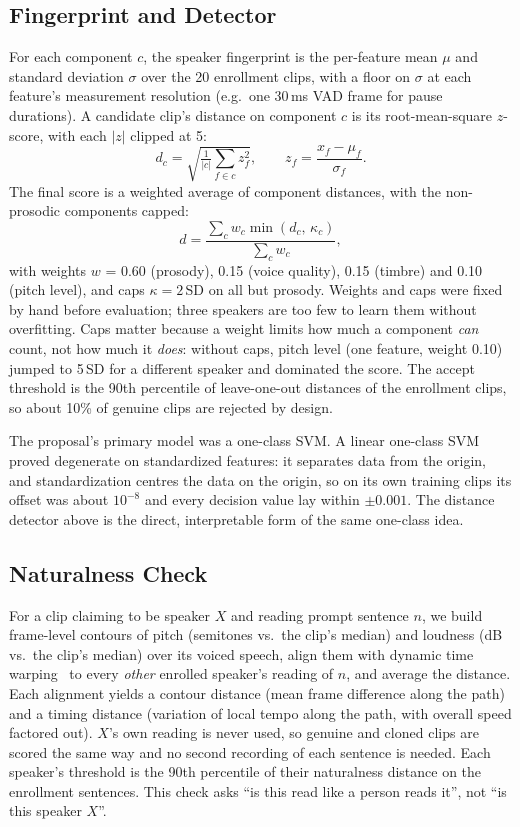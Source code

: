 \documentclass[11pt,a4paper]{article}
\begin{document}
\subsection{Fingerprint and Detector}
For each component $c$, the speaker fingerprint is the per-feature mean $\mu$ and standard deviation $\sigma$ over the 20 enrollment clips, with a floor on $\sigma$ at each feature's measurement resolution (e.g.\ one 30\,ms VAD frame for pause durations). A candidate clip's distance on component $c$ is its root-mean-square $z$-score, with each $|z|$ clipped at 5:
\begin{equation}
d_c = \sqrt{\tfrac{1}{|c|}\textstyle\sum_{f\in c} z_f^2}, \qquad z_f = \frac{x_f-\mu_f}{\sigma_f}.
\end{equation}
The final score is a weighted average of component distances, with the non-prosodic components capped:
\begin{equation}
d = \frac{\sum_c w_c \min(d_c,\, \kappa_c)}{\sum_c w_c},
\end{equation}
with weights $w$ = 0.60 (prosody), 0.15 (voice quality), 0.15 (timbre) and 0.10 (pitch level), and caps $\kappa = 2$\,SD on all but prosody. Weights and caps were fixed by hand before evaluation; three speakers are too few to learn them without overfitting. Caps matter because a weight limits how much a component \emph{can} count, not how much it \emph{does}: without caps, pitch level (one feature, weight 0.10) jumped to 5\,SD for a different speaker and dominated the score. The accept threshold is the 90th percentile of leave-one-out distances of the enrollment clips, so about 10\% of genuine clips are rejected by design.

The proposal's primary model was a one-class SVM. A linear one-class SVM proved degenerate on standardized features: it separates data from the origin, and standardization centres the data on the origin, so on its own training clips its offset was about $10^{-8}$ and every decision value lay within $\pm0.001$. The distance detector above is the direct, interpretable form of the same one-class idea.

\subsection{Naturalness Check}
For a clip claiming to be speaker $X$ and reading prompt sentence $n$, we build frame-level contours of pitch (semitones vs.\ the clip's median) and loudness (dB vs.\ the clip's median) over its voiced speech, align them with dynamic time warping~\cite{dtw} to every \emph{other} enrolled speaker's reading of $n$, and average the distance. Each alignment yields a contour distance (mean frame difference along the path) and a timing distance (variation of local tempo along the path, with overall speed factored out). $X$'s own reading is never used, so genuine and cloned clips are scored the same way and no second recording of each sentence is needed. Each speaker's threshold is the 90th percentile of their naturalness distance on the enrollment sentences. This check asks ``is this read like a person reads it'', not ``is this speaker $X$''.
\end{document}
